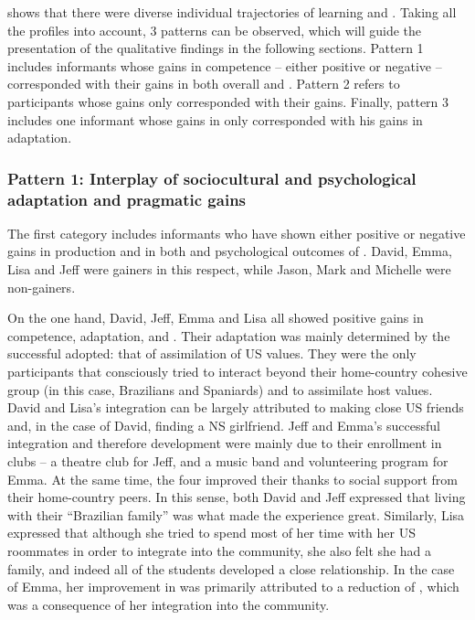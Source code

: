 \documentclass[output=paper]{langsci/langscibook}
\begin{document}
 
 shows that there were diverse individual trajectories of  learning and . Taking all the profiles into account, 3 patterns can be observed, which will guide the presentation of the qualitative findings in the following sections. Pattern 1 includes informants whose gains in  competence – either positive or negative – corresponded with their gains in both overall  and . Pattern 2 refers to participants whose  gains only corresponded with their  gains. Finally, pattern 3 includes one informant whose gains in  only corresponded with his gains in  adaptation.


\subsubsection{Pattern 1: Interplay of sociocultural and psychological adaptation and pragmatic gains}

The first category includes informants who have shown either positive or negative gains in  production and in both  and psychological outcomes of . David, Emma, Lisa and Jeff were gainers in this respect, while Jason, Mark and Michelle were non-gainers.

On the one hand, David, Jeff, Emma and Lisa all showed positive gains in  competence,  adaptation, and . Their  adaptation was mainly determined by the successful  adopted: that of assimilation of US  values. They were the only participants that consciously tried to interact beyond their home-country cohesive group (in this case, Brazilians and Spaniards) and to assimilate host values. David and Lisa’s integration can be largely attributed to making close US friends and, in the case of David, finding a NS girlfriend. Jeff and Emma’s successful integration and therefore  development were mainly due to their enrollment in clubs – a theatre club for Jeff, and a music band and volunteering program for Emma. At the same time, the four improved their  thanks to social support from their home-country peers. In this sense, both David and Jeff expressed that living with their “Brazilian family” was what made the experience great. Similarly, Lisa expressed that although she tried to spend most of her time with her US roommates in order to integrate into the community, she also felt she had a  family, and indeed all of the  students developed a close relationship. In the case of Emma, her improvement in  was primarily attributed to a reduction of , which was a consequence of her integration into the  community.
\end{document}
